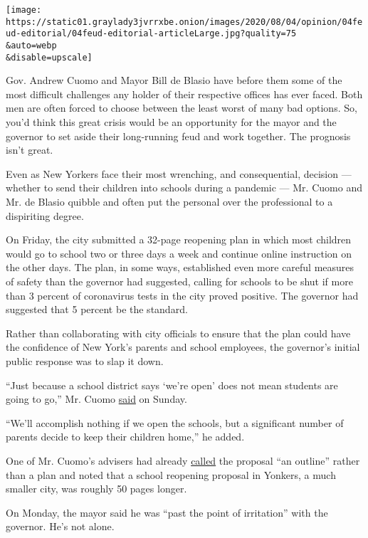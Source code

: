 \texttt{[image: https://static01.graylady3jvrrxbe.onion/images/2020/08/04/opinion/04feud-editorial/04feud-editorial-articleLarge.jpg?quality=75\\\&auto=webp\\\&disable=upscale]}

Gov. Andrew Cuomo and Mayor Bill de Blasio have before them some of the
most difficult challenges any holder of their respective offices has
ever faced. Both men are often forced to choose between the least worst
of many bad options. So, you'd think this great crisis would be an
opportunity for the mayor and the governor to set aside their
long-running feud and work together. The prognosis isn't great.

Even as New Yorkers face their most wrenching, and consequential,
decision --- whether to send their children into schools during a
pandemic --- Mr. Cuomo and Mr. de Blasio quibble and often put the
personal over the professional to a dispiriting degree.

On Friday, the city submitted a 32-page reopening plan in which most
children would go to school two or three days a week and continue online
instruction on the other days. The plan, in some ways, established even
more careful measures of safety than the governor had suggested, calling
for schools to be shut if more than 3 percent of coronavirus tests in
the city proved positive. The governor had suggested that 5 percent be
the standard.

Rather than collaborating with city officials to ensure that the plan
could have the confidence of New York's parents and school employees,
the governor's initial public response was to slap it down.

``Just because a school district says `we're open' does not mean
students are going to go,'' Mr. Cuomo
\href{https://www.nydailynews.com/news/politics/ny-cuomo-de-blasio-schools-reopen-20200802-s3bdp5yix5he7mrxr2uez2cwfu-story.html}{said}
on Sunday.

``We'll accomplish nothing if we open the schools, but a significant
number of parents decide to keep their children home,'' he added.

One of Mr. Cuomo's advisers had already
\href{https://nypost.com/2020/08/02/senior-cuomo-aide-slams-de-blasios-reopening-plan-as-an-outline/}{called}
the proposal ``an outline'' rather than a plan and noted that a school
reopening proposal in Yonkers, a much smaller city, was roughly 50 pages
longer.

On Monday, the mayor said he was ``past the point of irritation'' with
the governor. He's not alone.

